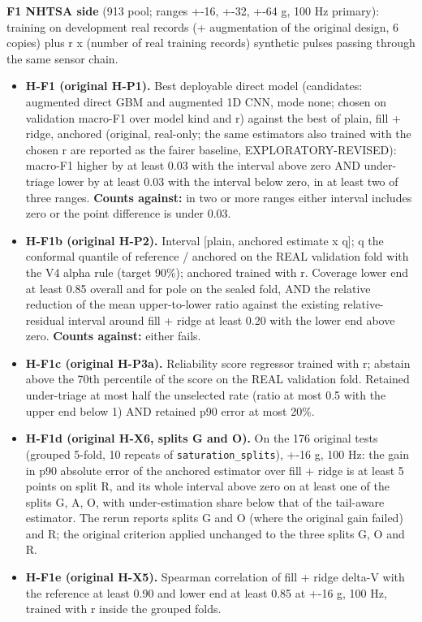\textbf{F1 NHTSA side} (913 pool; ranges +-16, +-32, +-64 g, 100 Hz primary): training on development real records (+ augmentation of the original design, 6 copies) plus r x (number of real training records) synthetic pulses passing through the same sensor chain.
\begin{itemize}
\item \textbf{H-F1 (original H-P1).} Best deployable direct model (candidates: augmented direct GBM and augmented 1D CNN, mode none; chosen on validation macro-F1 over model kind and r) against the best of plain, fill + ridge, anchored (original, real-only; the same estimators also trained with the chosen r are reported as the fairer baseline, EXPLORATORY-REVISED): macro-F1 higher by at least 0.03 with the interval above zero AND under-triage lower by at least 0.03 with the interval below zero, in at least two of three ranges. \textbf{Counts against:} in two or more ranges either interval includes zero or the point difference is under 0.03.
\item \textbf{H-F1b (original H-P2).} Interval [plain, anchored estimate x q]; q the conformal quantile of reference / anchored on the REAL validation fold with the V4 alpha rule (target 90\%); anchored trained with r. Coverage lower end at least 0.85 overall and for pole on the sealed fold, AND the relative reduction of the mean upper-to-lower ratio against the existing relative-residual interval around fill + ridge at least 0.20 with the lower end above zero. \textbf{Counts against:} either fails.
\item \textbf{H-F1c (original H-P3a).} Reliability score regressor trained with r; abstain above the 70th percentile of the score on the REAL validation fold. Retained under-triage at most half the unselected rate (ratio at most 0.5 with the upper end below 1) AND retained p90 error at most 20\%.
\item \textbf{H-F1d (original H-X6, splits G and O).} On the 176 original tests (grouped 5-fold, 10 repeats of \texttt{saturation\_splits}), +-16 g, 100 Hz: the gain in p90 absolute error of the anchored estimator over fill + ridge is at least 5 points on split R, and its whole interval above zero on at least one of the splits G, A, O, with under-estimation share below that of the tail-aware estimator. The rerun reports splits G and O (where the original gain failed) and R; the original criterion applied unchanged to the three splits G, O and R.
\item \textbf{H-F1e (original H-X5).} Spearman correlation of fill + ridge delta-V with the reference at least 0.90 and lower end at least 0.85 at +-16 g, 100 Hz, trained with r inside the grouped folds.
\end{itemize}
